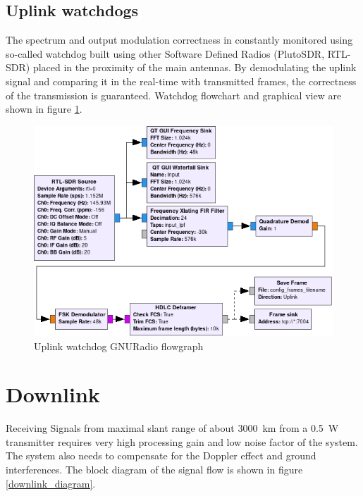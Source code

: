 \subsection{Uplink watchdogs}
The spectrum and output modulation correctness in constantly monitored using so-called watchdog built using other Software Defined Radios (PlutoSDR, RTL-SDR) placed in the proximity of the main antennas.
By demodulating the uplink signal and comparing it in the real-time with transmitted frames, the correctness of the transmission is guaranteed. Watchdog flowchart and graphical view are shown in figure \ref{uplink_watchdog_flowgraph}.

\begin{figure}[H]
    \centering
    \includegraphics[width=0.8\paperwidth]{img/7/uplink_watchdog_flowgraph.png}
    \caption{Uplink watchdog GNURadio flowgraph}
    \label{uplink_watchdog_flowgraph}
\end{figure}

\newpage



\section{Downlink}
Receiving Signals from maximal slant range of about \SI{3000}{\kilo\meter} from a \SI{0.5}{\watt} transmitter requires very high processing gain and low noise factor of the system. The system also needs to compensate for the Doppler effect and ground interferences. The block diagram of the signal flow is shown in figure \ref{downlink_diagram}.

